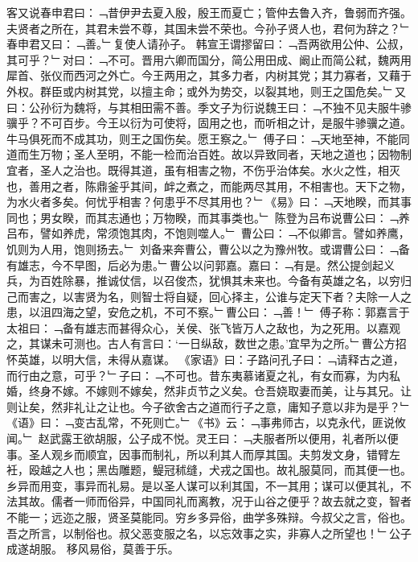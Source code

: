 客又说春申君曰：﹁昔伊尹去夏入殷，殷王而夏亡；管仲去鲁入齐，鲁弱而齐强。夫贤者之所在，其君未尝不尊，其国未尝不荣也。今孙子贤人也，君何为辞之？﹂春申君又曰：﹁善。﹂复使人请孙子。
韩宣王谓摎留曰：﹁吾两欲用公仲、公叔，其可乎？﹂对曰：﹁不可。晋用六卿而国分，简公用田成、阚止而简公弒，魏两用犀首、张仪而西河之外亡。今王两用之，其多力者，内树其党；其力寡者，又藉于外权。群臣或内树其党，以擅主命；或外为势交，以裂其地，则王之国危矣。﹂又曰：公孙衍为魏将，与其相田需不善。季文子为衍说魏王曰：﹁不独不见夫服牛骖骥乎？不可百步。今王以衍为可使将，固用之也，而听相之计，是服牛骖骥之道。牛马俱死而不成其功，则王之国伤矣。愿王察之。﹂
傅子曰：﹁天地至神，不能同道而生万物；圣人至明，不能一检而治百姓。故以异致同者，天地之道也；因物制宜者，圣人之治也。既得其道，虽有相害之物，不伤乎治体矣。水火之性，相灭也，善用之者，陈鼎釜乎其间，衅之煮之，而能两尽其用，不相害也。天下之物，为水火者多矣。何忧乎相害？何患乎不尽其用也？﹂《易》曰：﹁天地睽，而其事同也；男女睽，而其志通也；万物睽，而其事类也。﹂
陈登为吕布说曹公曰：﹁养吕布，譬如养虎，常须饱其肉，不饱则噬人。﹂
曹公曰：﹁不似卿言。譬如养鹰，饥则为人用，饱则扬去。﹂
刘备来奔曹公，曹公以之为豫州牧。或谓曹公曰：﹁备有雄志，今不早图，后必为患。﹂曹公以问郭嘉。嘉曰：﹁有是。然公提剑起义兵，为百姓除暴，推诚仗信，以召俊杰，犹惧其未来也。今备有英雄之名，以穷归己而害之，以害贤为名，则智士将自疑，回心择主，公谁与定天下者？夫除一人之患，以沮四海之望，安危之机，不可不察。﹂曹公曰：﹁善！﹂
傅子称：郭嘉言于太祖曰：﹁备有雄志而甚得众心，关侯、张飞皆万人之敌也，为之死用。以嘉观之，其谋未可测也。古人有言曰：‘一日纵敌，数世之患。’宜早为之所。﹂曹公方招怀英雄，以明大信，未得从嘉谋。
《家语》曰：子路问孔子曰：﹁请释古之道，而行由之意，可乎？﹂子曰：﹁不可也。昔东夷慕诸夏之礼，有女而寡，为内私婚，终身不嫁。不嫁则不嫁矣，然非贞节之义矣。仓吾娆取妻而美，让与其兄。让则让矣，然非礼让之让也。今子欲舍古之道而行子之意，庸知子意以非为是乎？﹂《语》曰：﹁变古乱常，不死则亡。﹂《书》云：﹁事弗师古，以克永代，匪说攸闻。﹂
赵武露王欲胡服，公子成不悦。灵王曰：﹁夫服者所以便用，礼者所以便事。圣人观乡而顺宜，因事而制礼，所以利其人而厚其国。夫剪发文身，错臂左衽，殴越之人也；黑齿雕题，鳀冠秫缝，犬戎之国也。故礼服莫同，而其便一也。乡异而用变，事异而礼易。是以圣人谋可以利其国，不一其用；谋可以便其礼，不法其故。儒者一师而俗异，中国同礼而离教，况于山谷之便乎？故去就之变，智者不能一；远迩之服，贤圣莫能同。穷乡多异俗，曲学多殊辩。今叔父之言，俗也。吾之所言，以制俗也。叔父恶变服之名，以忘效事之实，非寡人之所望也！﹂公子成遂胡服。
移风易俗，莫善于乐。
